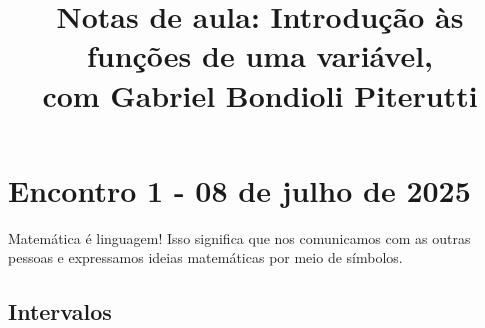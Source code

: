 \documentclass[12pt,openright,twoside,a4paper]{article}
\title{Notas de aula: Introdução às funções de uma variável, \\ \large com Gabriel Bondioli Piterutti}
\date{\vspace{-5ex}}
\theoremstyle{definition}
\begin{document}
	\nocite{*}
	\maketitle
	\tableofcontents
	\newpage
	
	\section{Encontro 1 - 08 de julho de 2025}
	
	Matemática é linguagem! Isso significa que nos comunicamos com as outras pessoas e expressamos ideias matemáticas por meio de símbolos.
	
	\subsection{Intervalos}
	
\end{document}
